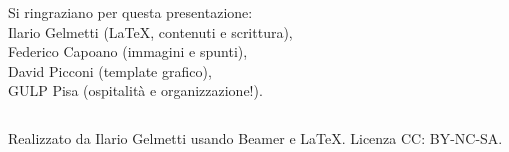 \documentclass{beamer}
\begin{document}
\begin{frame}
\begin{columns}
\vspace{10pt}
 \small{Si ringraziano per questa presentazione:\\ Ilario Gelmetti (LaTeX, contenuti e scrittura),\\ Federico Capoano (immagini e spunti),\\ David Picconi (template grafico),\\ GULP Pisa (ospitalità e organizzazione!).}\\
\vspace{5pt}
\begin{figure}{\vspace{-30pt}}\end{figure}
\end{columns}
{\scriptsize{Realizzato da Ilario Gelmetti usando Beamer e \LaTeX}. Licenza CC: BY-NC-SA.}

\end{frame}
\end{document}
